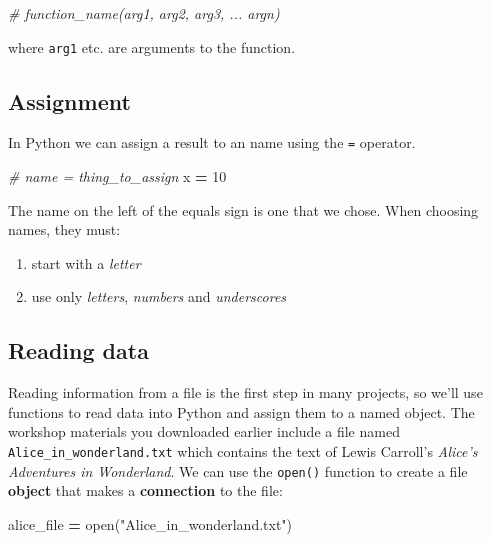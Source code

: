 \documentclass[
]{book}
\newenvironment{Shaded}{\begin{snugshade}}{\end{snugshade}}
\newcommand{\BuiltInTok}[1]{#1}
\newcommand{\CommentTok}[1]{\textcolor[rgb]{0.56,0.35,0.01}{\textit{#1}}}
\newcommand{\DecValTok}[1]{\textcolor[rgb]{0.00,0.00,0.81}{#1}}
\newcommand{\NormalTok}[1]{#1}
\newcommand{\OperatorTok}[1]{\textcolor[rgb]{0.81,0.36,0.00}{\textbf{#1}}}
\newcommand{\StringTok}[1]{\textcolor[rgb]{0.31,0.60,0.02}{#1}}
\providecommand{\tightlist}{%
  \setlength{\itemsep}{0pt}\setlength{\parskip}{0pt}}
\begin{document}
\begin{Shaded}
\begin{Highlighting}[]
\CommentTok{# function_name(arg1, arg2, arg3, ... argn)}
\end{Highlighting}
\end{Shaded}

where \texttt{arg1} etc. are arguments to the function.

\hypertarget{assignment-1}{%
\subsection{Assignment}\label{assignment-1}}

In Python we can assign a result to an name using the \texttt{=} operator.

\begin{Shaded}
\begin{Highlighting}[]
\CommentTok{# name = thing_to_assign}
\NormalTok{x }\OperatorTok{=} \DecValTok{10}
\end{Highlighting}
\end{Shaded}

The name on the left of the equals sign is one that we chose. When choosing names, they must:

\begin{enumerate}
\def\labelenumi{\arabic{enumi}.}
\tightlist
\item
  start with a \emph{letter}
\item
  use only \emph{letters}, \emph{numbers} and \emph{underscores}
\end{enumerate}

\hypertarget{reading-data-1}{%
\subsection{Reading data}\label{reading-data-1}}

Reading information from a file is the first step in many projects, so we'll use functions to read data into Python and assign them to a named object. The workshop materials you downloaded earlier include a file named \texttt{Alice\_in\_wonderland.txt} which contains the text of Lewis Carroll's \emph{Alice's Adventures in Wonderland}. We can use the \texttt{open()} function to create a file \textbf{object} that makes a \textbf{connection} to the file:

\begin{Shaded}
\begin{Highlighting}[]
\NormalTok{alice_file }\OperatorTok{=} \BuiltInTok{open}\NormalTok{(}\StringTok{"Alice_in_wonderland.txt"}\NormalTok{)}
\end{Highlighting}
\end{Shaded}
\end{document}
